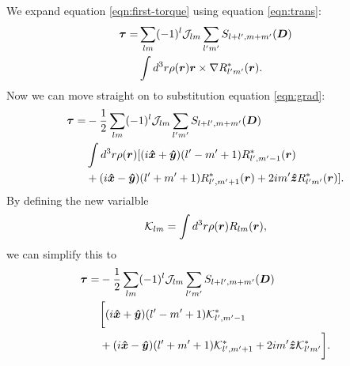 \documentclass[aps,twocolumn,secnumarabic,balancelastpage,amsmath,amssymb,nofootinbib,floatfix]{revtex4-1}
\begin{document}
We expand equation \ref{eqn:first-torque} using equation \ref{eqn:trans}:
\begin{equation*}
\begin{aligned}
\bm \tau = &\sum_{lm}(-1)^l\mathcal{J}_{lm}\sum_{l'm'}S_{l+l',m+m'}(\bm D) \\
&\int d^3 r \rho(\bm r) \bm r \times \nabla R^*_{l'm'}(\bm r).
\end{aligned}
\end{equation*}
Now we can move straight on to substitution equation \ref{eqn:grad}:
\begin{equation*}
\begin{aligned}
\bm \tau = &-\frac{1}{2}\sum_{lm}(-1)^l\mathcal{J}_{lm}\sum_{l'm'}S_{l+l',m+m'}(\bm D) \\
&\int d^3 r \rho(\bm r) [(i\bm{\hat x} + \bm{\hat y})(l'-m'+1)R^*_{l',m'-1}(\bm r)\\
&+(i\bm{\hat x}-\bm{\hat y})(l'+m'+1)R^*_{l',m'+1}(\bm r)+2im'\bm{\hat z} R^*_{l'm'}(\bm r)].
\end{aligned}
\end{equation*}
By defining the new varialble
\begin{equation}
\mathcal{K}_{lm} = \int d^3 r \rho(\bm r) R_{lm} (\bm r),
\label{eqn:klm-def}
\end{equation}
we can simplify this to
\begin{equation*}
\begin{aligned}
\bm \tau = &-\frac{1}{2}\sum_{lm}(-1)^l\mathcal{J}_{lm}\sum_{l'm'}S_{l+l',m+m'}(\bm D) \\
&\bigg[(i\bm{\hat x} + \bm{\hat y})(l'-m'+1)\mathcal{K}^*_{l',m'-1}\\
&+(i\bm{\hat x}-\bm{\hat y})(l'+m'+1)\mathcal{K}^*_{l',m'+1}+2im'\bm{\hat z} \mathcal{K}^*_{l'm'}\bigg].
\label{eqn:complex-torque}
\end{aligned}
\end{equation*}
\end{document}
